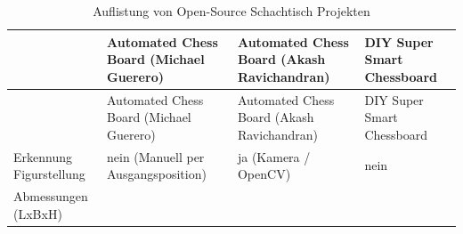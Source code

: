 \begin{longtable}[]{@{}llll@{}}
\caption{Auflistung von Open-Source Schachtisch
Projekten}\tabularnewline
\toprule
\begin{minipage}[b]{0.20\columnwidth}\raggedright
\strut
\end{minipage} & \begin{minipage}[b]{0.24\columnwidth}\raggedright
Automated Chess Board (Michael Guerero) \cite{actproject1}\strut
\end{minipage} & \begin{minipage}[b]{0.26\columnwidth}\raggedright
Automated Chess Board (Akash Ravichandran) \cite{actproject2}\strut
\end{minipage} & \begin{minipage}[b]{0.19\columnwidth}\raggedright
DIY Super Smart Chessboard \cite{actproject3}\strut
\end{minipage}\tabularnewline
\midrule
\endfirsthead
\toprule
\begin{minipage}[b]{0.20\columnwidth}\raggedright
\strut
\end{minipage} & \begin{minipage}[b]{0.24\columnwidth}\raggedright
Automated Chess Board (Michael Guerero) \cite{actproject1}\strut
\end{minipage} & \begin{minipage}[b]{0.26\columnwidth}\raggedright
Automated Chess Board (Akash Ravichandran) \cite{actproject2}\strut
\end{minipage} & \begin{minipage}[b]{0.19\columnwidth}\raggedright
DIY Super Smart Chessboard \cite{actproject3}\strut
\end{minipage}\tabularnewline
\midrule
\endhead
\begin{minipage}[t]{0.20\columnwidth}\raggedright
Erkennung Figurstellung\strut
\end{minipage} & \begin{minipage}[t]{0.24\columnwidth}\raggedright
nein (Manuell per Ausgangsposition)\strut
\end{minipage} & \begin{minipage}[t]{0.26\columnwidth}\raggedright
ja (Kamera / OpenCV)\strut
\end{minipage} & \begin{minipage}[t]{0.19\columnwidth}\raggedright
nein\strut
\end{minipage}\tabularnewline
\begin{minipage}[t]{0.20\columnwidth}\raggedright
Abmessungen (LxBxH)\strut

\end{minipage}
\end{longtable}
